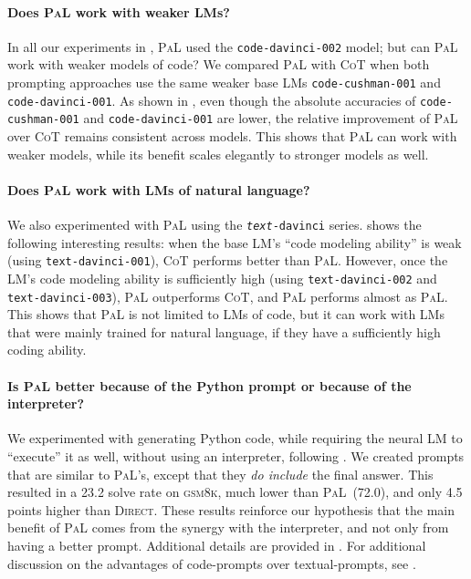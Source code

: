 \documentclass[dvipsnames]{article} \usepackage[accepted]{icml2022}
\newcommand{\ours}{\textsc{PaL}\xspace}
\newcommand{\cotp}{\textsc{CoT}\xspace}
\newcommand{\direct}{\textsc{Direct}\xspace}
\newcommand{\gsm}{\textsc{gsm8k}\xspace}
\begin{document}
\paragraph{Does \ours work with weaker LMs?} In all our experiments in , \ours used the \texttt{code-davinci-002} model; but can \ours work with weaker models of code? We compared \ours with \cotp when both prompting approaches use the same weaker base LMs \texttt{code-cushman-001} and \texttt{code-davinci-001}. As shown in , even though the absolute accuracies of \texttt{code-cushman-001} and \texttt{code-davinci-001} are lower, the relative improvement of \ours over \cotp remains consistent across models.
This shows that \ours can work with weaker models, while its benefit scales elegantly to stronger models as well.

\paragraph{Does \ours work with LMs of natural language?} We also experimented with \ours using the \texttt{\emph{text}-davinci} series.  shows the following interesting results: when the base LM's ``code modeling ability'' is weak (using \texttt{text-davinci-001}), \cotp performs better than \ours. However, once the LM's code modeling ability is sufficiently high (using \texttt{text-davinci-002} and \texttt{text-davinci-003}), \ours outperforms \cotp, and \ours performs almost as \ours.
This shows that \ours is not limited to LMs of code, but it can work with LMs that were mainly trained for natural language, if they have a sufficiently high coding ability.


\paragraph{Is \ours better because of the Python prompt or because of the interpreter?} We experimented with generating Python code, while requiring the neural LM to ``execute'' it as well, without using an interpreter, following \citet{scratchpad2021,cocogen}. We created prompts that are similar to \ours's, except that they \emph{do include} the final answer. 
This resulted in a 23.2 solve rate on \gsm, much lower than \ours~(72.0), and only 4.5 points higher than \direct.
These results reinforce our hypothesis that the main benefit of \ours comes from the synergy with the interpreter, and not only from having a better prompt.
Additional details are provided in .
For additional discussion on the advantages of code-prompts over textual-prompts, see .
\end{document}
